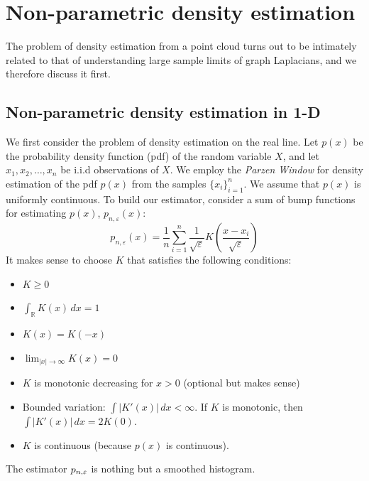 \section{Non-parametric density estimation} 
The problem of density estimation from a point cloud turns out to be intimately related to that of understanding large sample limits of graph Laplacians, and we therefore discuss it first.  

\subsection{Non-parametric density estimation in 1-D}

We first consider the problem of density estimation on the real line.
Let $p(x)$ be the probability density function (pdf) of the random variable $X$, and let $x_1,x_2,\ldots,x_n$ be i.i.d observations of $X$.
We employ the {\em Parzen Window} \cite{parzen1962estimation} for density estimation of the pdf $p(x)$ from the samples $\{x_i\}_{i=1}^n$.
We assume that $p(x)$ is uniformly continuous.
To build our estimator, consider a sum of bump functions for estimating $p(x)$, $p_{n,\varepsilon}(x)$:
\[
p_{n,\varepsilon}(x) = \frac{1}{n} \sum_{i=1}^n \frac{1}{\sqrt{\varepsilon}} K\left(\frac{x-x_i}{\sqrt{\varepsilon}} \right)
\]
It makes sense to choose $K$ that satisfies the following conditions:
\begin{itemize}
\item $K \geq 0$
\item $\int_\mathbb{R} K(x)\,dx = 1$
\item $K(x) = K(-x)$
\item $\lim_{|x|\to \infty} K(x)=0$
\item $K$ is monotonic decreasing for $x>0$ (optional but makes sense)
\item Bounded variation: $\int |K'(x)|\,dx < \infty$. If $K$ is monotonic, then $\int |K'(x)|\,dx = 2K(0)$.
\item $K$ is continuous (because $p(x)$ is continuous).
\end{itemize}
The estimator $p_{n,\varepsilon}$ is nothing but a smoothed histogram.

